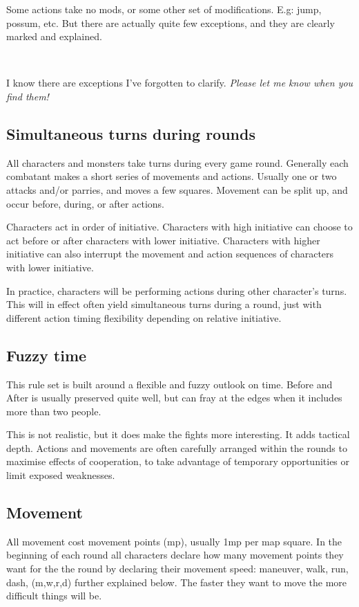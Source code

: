 Some actions take no mods, or some other set of modifications. E.g: jump, possum, etc. But there are actually quite few exceptions, and they are clearly marked and explained.

\

\todo I know there are exceptions I've forgotten to clarify. \emph{Please let me know when you find them!}


\subsection*{Simultaneous turns during rounds}
All characters and monsters take turns during every game round. Generally each combatant makes a short series of movements and actions. Usually one or two attacks and/or parries, and moves a few squares. Movement can be split up, and occur before, during, or after actions.

Characters act in order of initiative. Characters with high initiative can choose to act before or after characters with lower initiative. Characters with higher initiative can also interrupt the movement and action sequences of characters with lower initiative.

In practice, characters will be performing actions during other character's turns. This will in effect often yield simultaneous turns during a round, just with different action timing flexibility depending on relative initiative.


\subsection*{Fuzzy time}
This rule set is built around a flexible and fuzzy outlook on time. Before and After is usually preserved quite well, but can fray at the edges when it includes more than two people.

This is not realistic, but it does make the fights more interesting. It adds tactical depth. Actions and movements are often carefully arranged within the rounds to maximise effects of cooperation, to take advantage of temporary opportunities or limit exposed weaknesses.


\subsection*{Movement}
All movement cost movement points (mp), usually 1mp per map square. In the beginning of each round all characters declare how many movement points they want for the the round by declaring their movement speed: maneuver, walk, run, dash, (m,w,r,d) further explained below. The faster they want to move the more difficult things will be.

